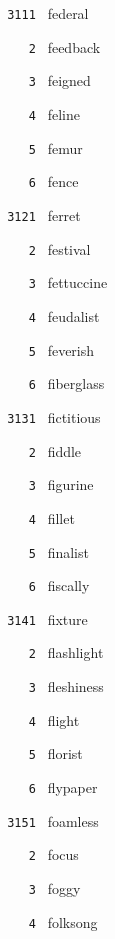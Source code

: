 \documentclass[11pt]{article}
\begin{document}
\begin{multicols}{6}
\footnotesize
\noindent \texttt{ 3111 } federal  \par
\noindent \texttt{ \ \ \ 2 } feedback  \par
\noindent \texttt{ \ \ \ 3 } feigned  \par
\noindent \texttt{ \ \ \ 4 } feline  \par
\noindent \texttt{ \ \ \ 5 } femur  \par
\noindent \texttt{ \ \ \ 6 } fence  \par
\vspace{3mm}
\noindent \texttt{ 3121 } ferret  \par
\noindent \texttt{ \ \ \ 2 } festival  \par
\noindent \texttt{ \ \ \ 3 } fettuccine  \par
\noindent \texttt{ \ \ \ 4 } feudalist  \par
\noindent \texttt{ \ \ \ 5 } feverish  \par
\noindent \texttt{ \ \ \ 6 } fiberglass  \par
\vspace{3mm}
\noindent \texttt{ 3131 } fictitious  \par
\noindent \texttt{ \ \ \ 2 } fiddle  \par
\noindent \texttt{ \ \ \ 3 } figurine  \par
\noindent \texttt{ \ \ \ 4 } fillet  \par
\noindent \texttt{ \ \ \ 5 } finalist  \par
\noindent \texttt{ \ \ \ 6 } fiscally  \par
\vspace{3mm}
\noindent \texttt{ 3141 } fixture  \par
\noindent \texttt{ \ \ \ 2 } flashlight  \par
\noindent \texttt{ \ \ \ 3 } fleshiness  \par
\noindent \texttt{ \ \ \ 4 } flight  \par
\noindent \texttt{ \ \ \ 5 } florist  \par
\noindent \texttt{ \ \ \ 6 } flypaper  \par
\vspace{3mm}
\noindent \texttt{ 3151 } foamless  \par
\noindent \texttt{ \ \ \ 2 } focus  \par
\noindent \texttt{ \ \ \ 3 } foggy  \par
\noindent \texttt{ \ \ \ 4 } folksong  \par

\end{multicols}
\end{document}
